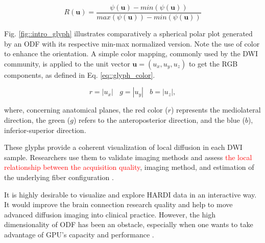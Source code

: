 \documentclass[twoside,twocolumn,10pt]{article}
\begin{document}

\begin{equation}
\label{eq::normglifo}
    R(\bm{u}) = \frac{\psi(\bm{u}) - min(\psi(\bm{u}))}{max(\psi(\bm{u})) - min(\psi(\bm{u}))}
\end{equation}

Fig. \ref{fig::intro_glyph} illustrates comparatively a spherical polar plot generated by an ODF with its respective min-max normalized version. Note the use of color to enhance the orientation. A simple color mapping, commonly used by the DWI community, is applied to the unit vector  $\bm{u} = (u_x, u_y, u_z)$ to get the RGB components, as defined in Eq. \ref{eq::glyph_color}.

\begin{equation}
\label{eq::glyph_color}
    r = |u_x| ~~~~ g = |u_y| ~~~~ b = |u_z|, 
\end{equation}

where, concerning anatomical planes, the red color ($r$) represents the mediolateral direction, the green ($g$) refers to the anteroposterior direction, and the blue ($b$), inferior-superior direction.


These glyphs provide a coherent visualization of local diffusion in each DWI sample. Researchers use them to validate imaging methods \cite{descoteaux2007_QBI,  TuchQBall2004,tournier2007,Tournier2004DirectEO, tuch2002,  yeh2010} and assess \textcolor{red}{the local relationship between the acquisition quality}, imaging method, and estimation of the underlying fiber configuration \cite{cho2008, daducci2014,descoteaux2007, vega2009}. %

It is highly desirable to visualize and explore HARDI data in an interactive way. It would improve the brain connection research quality and help to move advanced diffusion imaging into clinical practice. However, the high dimensionality of ODF has been an obstacle, especially when one wants to take advantage of GPU's capacity and performance \cite{peeters2009}.
\end{document}
